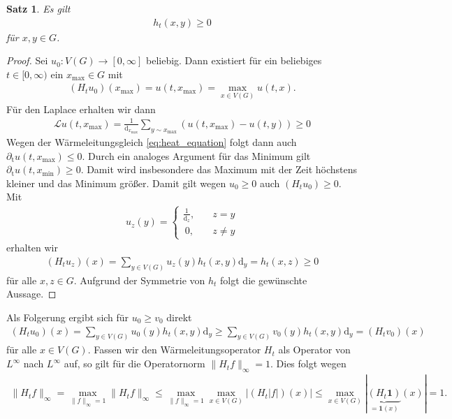 \documentclass[headsepline,11pt]{scrbook}
\newtheorem{thm}[lem]{Satz}
\theoremstyle{definition}
\begin{document}
\begin{thm}\label{th:pos_heat_kernel_global}
	Es gilt 
	\begin{align}
	h_t(x,y) \geq 0
	\end{align}
	f\"ur $ x,y \in G $.
\end{thm}

\begin{proof}
	Sei $ u_0 : V(G)  \to [0,\infty]$ beliebig.
	Dann existiert f\"ur ein beliebiges $ t \in [0, \infty) $ ein 
	$ x_{\textrm{max}}  \in  G$ mit
	\begin{align*}
	(H_t u_0)(x_{\mathrm{max}}) = u(t,x_{\mathrm{max}}) = \max\limits_{x \in V(G) } u(t,x).
	\end{align*}
	F\"ur den Laplace erhalten wir dann
	\begin{align*}
	\mathcal{L}u(t,x_{\mathrm{max}} ) =
	\frac{1}{\mathrm{d}_{x_{\mathrm{max}}}}
	\sum 
	\limits_{y \sim x_{\mathrm{max}}}
	(u(t,x_\mathrm{max}) - u(t,y)) \geq 0
	\end{align*}
	Wegen der W\"armeleitungsgleich \eqref{eq:heat_equation} folgt dann auch $ \partial_\mathrm{t} u(t,x_{\mathrm{max}}) \leq 0 $.
	Durch ein analoges Argument f\"ur das Minimum gilt $ \partial_\mathrm{t} u(t,x_\mathrm{min}) \geq 0 $.
	Damit wird insbesondere das Maximum mit der Zeit h\"ochstens kleiner und das Minimum gr\"o\ss{}er. 
	Damit gilt wegen $ u_0 \geq 0  $ auch $ (H_t u_0) \geq 0 $.
	Mit 
	\begin{align*}
	u_z(y) =
	\begin{cases}
	\frac{1}{\mathrm{d}_z} , &\quad z=y\\
	\ 0 ,						&\quad z \neq y
	\end{cases} 
	\end{align*}
	erhalten wir
	\begin{align*}
	(H_t u_z )(x) = \sum \limits_{y \in V(G)}
	u_z(y) h_t(x,y) \mathrm{d}_y
	= h_t(x,z) \geq 0
	\end{align*}
	f\"ur alle $ x,z \in G $.
	Aufgrund der Symmetrie von $ h_t $ folgt die gew\"unschte Aussage.
\end{proof}

Als Folgerung ergibt sich f\"ur $ u_0 \geq v_0 $ direkt
\begin{align}
(H_t u_0)(x)
=
\sum \limits_{y \in V(G)}
u_0(y) h_t(x,y) \mathrm{d}_y
\geq 
\sum \limits_{y \in V(G)}
v_0(y) h_t(x,y) \mathrm{d}_y
=
(H_t v_0)(x)
\end{align}
f\"ur alle $ x \in V(G) $.
Fassen wir den W\"armeleitungsoperator $ H_t  $ als Operator von $ L^\infty $ nach $ L^\infty $ auf, so gilt f\"ur die Operatornorm $ \| H_t f \|_\infty = 1 $.
Dies folgt wegen
\begin{align*}
\| H_t f \|_\infty
= 
\max \limits_{ \| f \|_\infty = 1}
\| H_t f \|_\infty
\leq 
\max \limits_{ \| f \|_\infty = 1} 
\max \limits_{x \in V(G)}
| (H_t |f |)(x) | 
\leq 
\max \limits_{x \in V(G)} 
| \underbrace{(H_t \textbf{1})}_{
	= \textbf{1}(x)
	}(x) |
= 1.
\end{align*}
\end{document}
